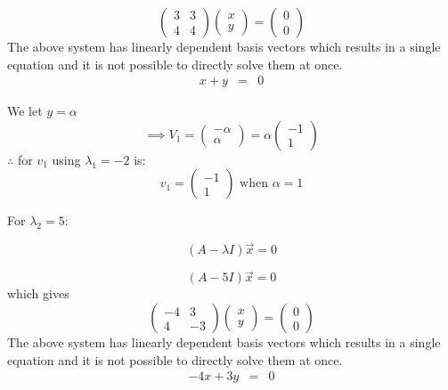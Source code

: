 \documentclass[12pt,a4paper]{article}
\begin{document}
\begin{enumerate}
      \[ 
        \begin{pmatrix} 3 & 3 \\ 4 & 4 \end{pmatrix} 
        \begin{pmatrix} x \\ y \end{pmatrix}
        =\begin{pmatrix} 0 \\ 0 \end{pmatrix}
      \]
	  The above system has linearly dependent basis vectors which results in a single equation and it is not possible to directly solve them at once.
      \begin{eqnarray*}
      x + y &=&0
      \end{eqnarray*}

      We let  $y=\alpha$  
       \[ 
       \implies    V_1=\begin{pmatrix} -\alpha \\ \alpha \end{pmatrix}
        =\alpha \begin{pmatrix} -1 \\ 1 \end{pmatrix}
      \]
      $\therefore $ for $v_1 $  using $\lambda_1 =-2$ is: 
      \[ 
        v_1= \begin{pmatrix} -1 \\ 1 \end{pmatrix} \text{ when } \alpha=1
      \]

      For   $\lambda_2 = 5 $:

      \begin{equation*}
      \left(A- \lambda I \right)\vec{x} =0 
      \end{equation*}

      \begin{equation*}
      \left(A -5 I \right)\vec{x} =0 
      \end{equation*}
    which gives 
    \[ 
      \begin{pmatrix} -4 & 3 \\ 4 & -3 \end{pmatrix} 
      \begin{pmatrix} x \\ y \end{pmatrix}
      =\begin{pmatrix} 0 \\ 0 \end{pmatrix}
    \]
The above system has linearly dependent basis vectors which results in a single equation and it is not possible to directly solve them at once.
    \begin{eqnarray*}
    -4x + 3y &=&0
    \end{eqnarray*}


\end{enumerate}
\end{document}
